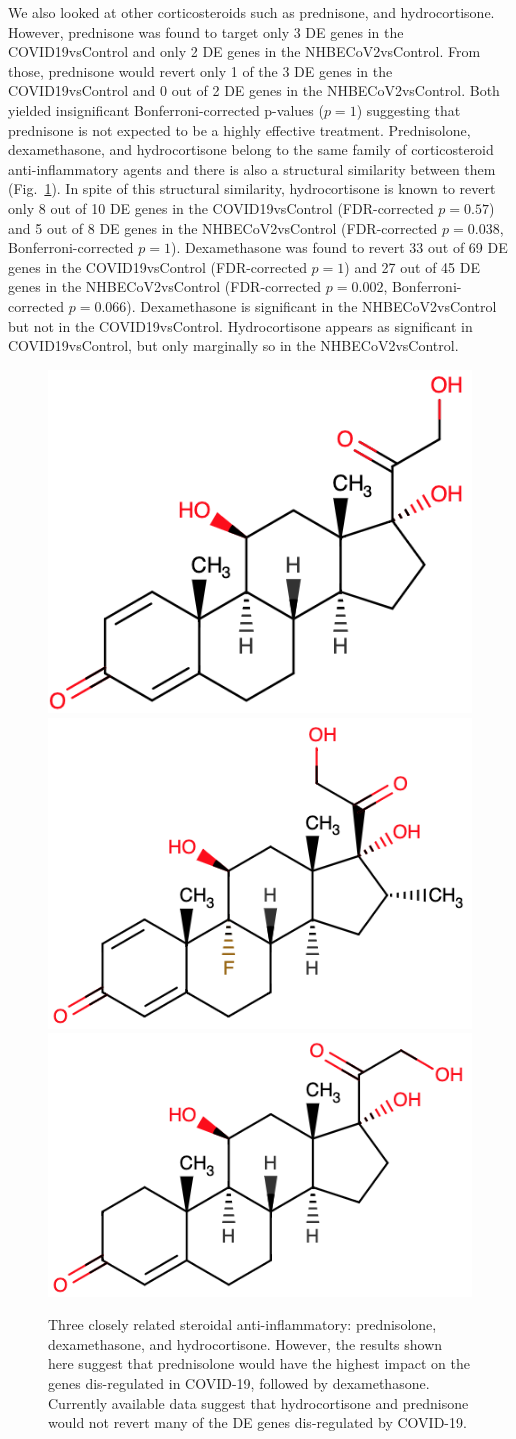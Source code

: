 \documentclass[Minh_PhD_thesis.tex]{subfiles}
\begin{document}
We also looked at other corticosteroids such as prednisone, and hydrocortisone. However, prednisone was found to target only 3 DE genes in the COVID19vsControl and only 2 DE genes in the NHBECoV2vsControl. From those, prednisone would revert only 1 of the 3 DE genes in the COVID19vsControl and 0 out of 2 DE genes in the NHBECoV2vsControl. Both yielded insignificant Bonferroni-corrected p-values ($p=1$) suggesting that prednisone is not expected to be a highly effective treatment. Prednisolone, dexamethasone, and hydrocortisone belong to the same family of corticosteroid anti-inflammatory agents and there is also a structural similarity between them (Fig.~\ref{Supp:steroids}). In spite of this structural similarity, hydrocortisone is known to revert only 8 out of 10 DE genes in the COVID19vsControl (FDR-corrected $p=0.57$) and 5 out of 8 DE genes in the NHBECoV2vsControl (FDR-corrected $p=0.038$, Bonferroni-corrected  $p=1$). Dexamethasone was found to revert 33 out of 69 DE genes in the COVID19vsControl (FDR-corrected $p=1$) and 27 out of 45 DE genes in the NHBECoV2vsControl (FDR-corrected $p=0.002$, Bonferroni-corrected $p=0.066$). Dexamethasone is significant in the NHBECoV2vsControl but not in the COVID19vsControl. Hydrocortisone appears as significant in COVID19vsControl, but only marginally so in the NHBECoV2vsControl.

\begin{figure}
\centering
	\includegraphics[width=0.2\linewidth]{../Figures/prednisolone.png}
	\includegraphics[width=0.2\linewidth]{../Figures/dexamethasone.png}
	\includegraphics[width=0.2\linewidth]{../Figures/hydrocortisone.png}
        \caption{Three closely related steroidal anti-inflammatory: prednisolone, dexamethasone, and hydrocortisone. However, the results shown here suggest that prednisolone would have the highest impact on the genes dis-regulated in COVID-19, followed by dexamethasone. Currently available data suggest that hydrocortisone and prednisone would not revert many of the DE genes dis-regulated by COVID-19.}
        \label{Supp:steroids}
\end{figure}
\end{document}

